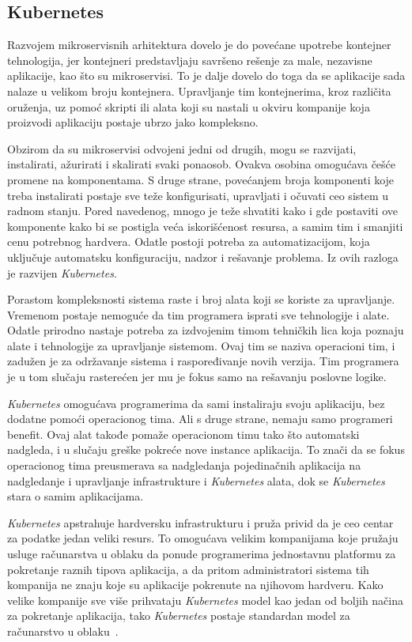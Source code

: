 \subsection{Kubernetes}\label{sec:kubernetes}

Razvojem mikroservisnih arhitektura dovelo je do povećane upotrebe kontejner tehnologija, jer 
kontejneri predstavljaju savršeno rešenje za male, nezavisne aplikacije, kao što su mikroservisi. 
To je dalje dovelo do toga da se aplikacije sada nalaze u velikom broju kontejnera. Upravljanje 
tim kontejnerima, kroz različita oruženja, uz pomoć skripti ili alata koji su nastali u okviru 
kompanije koja proizvodi aplikaciju postaje ubrzo jako kompleksno. 

Obzirom da su mikroservisi odvojeni jedni od drugih, mogu se razvijati, instalirati, ažurirati i skalirati svaki ponaosob.
Ovakva osobina omogućava češće promene na komponentama. S druge strane, povećanjem broja komponenti koje treba 
instalirati postaje sve teže konfigurisati, upravljati i očuvati ceo sistem u radnom stanju. Pored navedenog, mnogo 
je teže shvatiti kako i gde postaviti ove komponente kako bi se postigla veća iskorišćenost resursa, a samim tim i 
smanjiti cenu potrebnog hardvera. Odatle postoji potreba za automatizacijom, koja uključuje automatsku konfiguraciju,
nadzor  i rešavanje problema. Iz ovih razloga je razvijen \textit{Kubernetes}.

Porastom kompleksnosti sistema raste i broj alata koji se koriste za upravljanje. Vremenom postaje 
nemoguće da tim programera isprati sve tehnologije i alate. Odatle prirodno nastaje potreba za 
izdvojenim timom tehničkih lica koja poznaju alate i tehnologije za upravljanje sistemom. Ovaj tim 
se naziva operacioni tim, i zadužen je za održavanje sistema i raspoređivanje novih verzija. Tim 
programera je u tom slučaju rasterećen jer mu je fokus samo na rešavanju poslovne logike.

\textit{Kubernetes} omogućava programerima da sami instaliraju svoju aplikaciju, bez dodatne pomoći operacionog tima. 
Ali s druge strane, nemaju samo programeri benefit. Ovaj alat takođe pomaže operacionom timu tako što automatski nadgleda, 
i u slučaju greške pokreće nove instance aplikacija. To znači da se fokus operacionog tima preusmerava sa nadgledanja
pojedinačnih aplikacija na nadgledanje i upravljanje infrastrukture i \textit{Kubernetes} alata, dok se \textit{Kubernetes} stara o samim
aplikacijama.

\textit{Kubernetes} apstrahuje hardversku infrastrukturu i pruža privid da je ceo centar za podatke jedan veliki resurs. To omogućava
velikim kompanijama koje pružaju usluge računarstva u oblaku da ponude programerima jednostavnu platformu za pokretanje
raznih tipova aplikacija, a da pritom administratori sistema tih kompanija ne znaju koje su aplikacije pokrenute na njihovom
hardveru. Kako velike kompanije sve više prihvataju \textit{Kubernetes} model kao jedan od boljih načina za pokretanje aplikacija,
tako \textit{Kubernetes} postaje standardan model za računarstvo u oblaku~\cite{KIA}.

